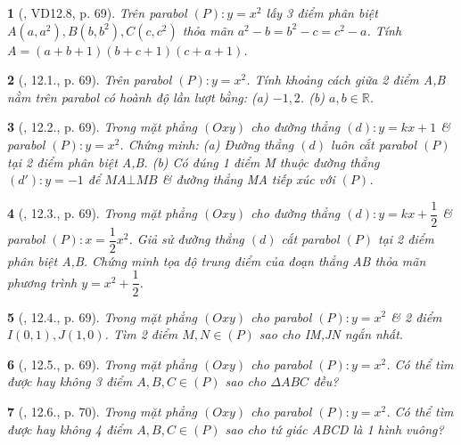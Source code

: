 \documentclass{article}
\newtheorem{baitoan}{}
\begin{document}
\begin{baitoan}[\cite{TLCT_THCS_Toan_9_dai_so}, VD12.8, p. 69]
	Trên parabol $(P):y = x^2$ lấy 3 điểm phân biệt $A(a,a^2),B(b,b^2),C(c,c^2)$ thỏa mãn $a^2 - b = b^2 - c = c^2 - a$. Tính $A =  (a + b + 1)(b + c + 1)(c + a + 1)$.
\end{baitoan}

\begin{baitoan}[\cite{TLCT_THCS_Toan_9_dai_so}, 12.1., p. 69]
	Trên parabol $(P):y = x^2$. Tính khoảng cách giữa 2 điểm A,B nằm trên parabol có hoành độ lần lượt bằng: (a) $-1,2$. (b) $a,b\in\mathbb{R}$.
\end{baitoan}

\begin{baitoan}[\cite{TLCT_THCS_Toan_9_dai_so}, 12.2., p. 69]
	Trong mặt phẳng $(Oxy)$ cho đường thẳng $(d):y = kx + 1$ \& parabol $(P):y = x^2$. Chứng minh: (a) Đường thẳng $(d)$ luôn cắt parabol $(P)$ tại 2 điểm phân biệt A,B. (b) Có đúng 1 điểm M thuộc đường thẳng $(d'):y = -1$ để $MA\bot MB$ \& đường thẳng MA tiếp xúc với $(P)$.
\end{baitoan}

\begin{baitoan}[\cite{TLCT_THCS_Toan_9_dai_so}, 12.3., p. 69]
	Trong mặt phẳng $(Oxy)$ cho đường thẳng $(d):y = kx + \dfrac{1}{2}$ \& parabol $(P):x = \dfrac{1}{2}x^2$. Giả sử đường thẳng $(d)$ cắt parabol $(P)$ tại 2 điểm phân biệt A,B. Chứng minh tọa độ trung điểm của đoạn thẳng AB thỏa mãn phương trình $y = x^2 + \dfrac{1}{2}$.
\end{baitoan}

\begin{baitoan}[\cite{TLCT_THCS_Toan_9_dai_so}, 12.4., p. 69]
	Trong mặt phẳng $(Oxy)$ cho parabol $(P): y = x^2$ \& 2 điểm $I(0,1),J(1,0)$. Tìm 2 điểm $M,N\in(P)$ sao cho IM,JN ngắn nhất.
\end{baitoan}

\begin{baitoan}[\cite{TLCT_THCS_Toan_9_dai_so}, 12.5., p. 69]
	Trong mặt phẳng $(Oxy)$ cho parabol $(P): y = x^2$. Có thể tìm được hay không 3 điểm $A,B,C\in(P)$ sao cho $\Delta ABC$ đều?
\end{baitoan}

\begin{baitoan}[\cite{TLCT_THCS_Toan_9_dai_so}, 12.6., p. 70]
	Trong mặt phẳng $(Oxy)$ cho parabol $(P): y = x^2$. Có thể tìm được hay không 4 điểm $A,B,C\in(P)$ sao cho tứ giác ABCD là 1 hình vuông?
\end{baitoan}
\end{document}
